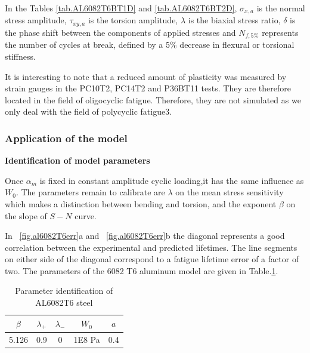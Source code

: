 \documentclass[3p,times,number,review]{elsarticle}
\newcommand{\figref}[1]{\figurename~\ref{#1}}
\begin{document}
In the Tables \ref{tab.AL6082T6BT1D} and \ref{tab.AL6082T6BT2D}, $\sigma_{x,a}$ is the normal stress amplitude, $\tau_{xy,a}$ is the torsion amplitude, $\lambda$ is the biaxial stress ratio, $\delta$ is the phase shift between the components of applied stresses and $N_{f,5\%}$ represents the number of cycles at break, defined by a 5\% decrease in flexural or torsional stiffness.

It is interesting to note that a reduced amount of plasticity was measured by strain gauges in the PC10T2, PC14T2 and P36BT11 tests\cite{susmel2003multiaxial}. They are therefore located in the field of oligocyclic fatigue. Therefore, they are not simulated as we only deal with the field of polycyclic fatigue3.

\subsubsection{Application of the model}

\textbf{Identification of model parameters}
\vspace{6pt}

Once $\alpha_m$ is fixed in constant amplitude cyclic loading,it has the same influence as $W_0$. The parameters remain to calibrate are $\lambda$ on the mean stress sensitivity which makes a distinction between bending and torsion, and the exponent $\beta$ on the slope of $S-N$ curve. 

In \figref{fig.al6082T6err}a and \figref{fig.al6082T6err}b the diagonal represents a good correlation between the experimental and predicted lifetimes. The line segments on either side of the diagonal correspond to a fatigue lifetime error of a factor of two. The parameters of the 6082 T6 aluminum model are given in Table.\ref{tab.6082T6para}.

\begin{table}[]
\centering
\begin{tabular}{|c|c|c|c|c|}
	\hline
	\textbf{$\beta$} & \textbf{$\lambda_+$} & \textbf{$\lambda_-$} & \textbf{$W_0$} & \textbf{$a$}  \\ \hline
	5.126     & 0.9 &0         &1E8 Pa  & 0.4    \\ \hline
\end{tabular}
\caption{Parameter identification of AL6082T6 steel}
\label{tab.6082T6para}
\end{table}

\end{document}
